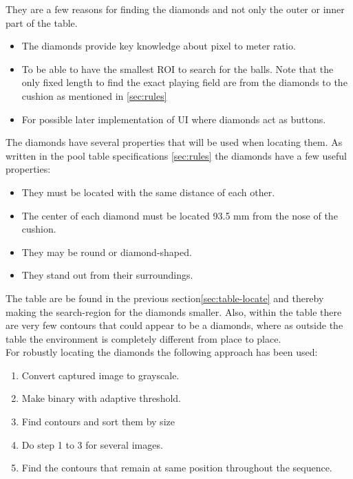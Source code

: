 They are a few reasons for finding the diamonds and not only the outer or inner part of the table.

\begin{itemize}
	\item The diamonds provide key knowledge about pixel to meter ratio.
	\item To be able to have the smallest ROI to search for the balls. Note that the only fixed length to find the exact playing field are from the diamonds to the cushion as mentioned in \ref{sec:rules}
	\item For possible later implementation of UI where diamonds act as buttons.
\end{itemize}

The diamonds have several properties that will be used when locating them. As written in the pool table specifications \ref{sec:rules} the diamonds have a few useful properties:

\begin{itemize}
	\item They must be located with the same distance of each other.
	\item The center of each diamond must be located 93.5 mm from the nose of the cushion.
	\item They may be round or diamond-shaped.
	\item They stand out from their surroundings.
\end{itemize}

The table are be found in the previous section\ref{sec:table-locate} and thereby making the search-region for the diamonds smaller. Also, within the table there are very few contours that could appear to be a diamonds, where as outside the table the environment is completely different from place to place.\\

For robustly locating the diamonds the following approach has been used:
\begin{enumerate}
	\item Convert captured image to grayscale.
	\item Make binary with adaptive threshold.
	\item Find contours and sort them by size
	\item Do step 1 to 3 for several images.
	\item Find the contours that remain at same position throughout the sequence.
\end{enumerate}

